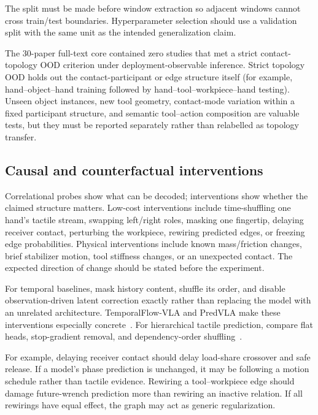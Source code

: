 The split must be made before window extraction so adjacent windows cannot cross
train/test boundaries. Hyperparameter selection should use a validation split
with the same unit as the intended generalization claim.

The 30-paper full-text core contained zero studies that met a strict
contact-topology OOD criterion under deployment-observable inference. Strict
topology OOD holds out the contact-participant or edge structure itself (for
example, hand--object--hand training followed by hand--tool--workpiece--hand
testing). Unseen object instances, new tool geometry, contact-mode variation
within a fixed participant structure, and semantic tool--action composition are
valuable tests, but they must be reported separately rather than relabelled as
topology transfer.

\subsection{Causal and counterfactual interventions}

Correlational probes show what can be decoded; interventions show whether the
claimed structure matters. Low-cost interventions include time-shuffling one
hand's tactile stream, swapping left/right roles, masking one fingertip, delaying
receiver contact, perturbing the workpiece, rewiring predicted edges, or freezing
edge probabilities. Physical interventions include known mass/friction changes,
brief stabilizer motion, tool stiffness changes, or an unexpected contact. The
expected direction of change should be stated before the experiment.

For temporal baselines, mask history content, shuffle its order, and disable
observation-driven latent correction exactly rather than replacing the model with
an unrelated architecture. TemporalFlow-VLA and PredVLA make these interventions
especially concrete~\cite{yang2026temporalflowvla,sawada2026predvla}. For
hierarchical tactile prediction, compare flat heads, stop-gradient removal, and
dependency-order shuffling~\cite{xue2026hitacwam}.

For example, delaying receiver contact should delay load-share crossover and safe
release. If a model's phase prediction is unchanged, it may be following a motion
schedule rather than tactile evidence. Rewiring a tool--workpiece edge should
damage future-wrench prediction more than rewiring an inactive relation. If all
rewirings have equal effect, the graph may act as generic regularization.

